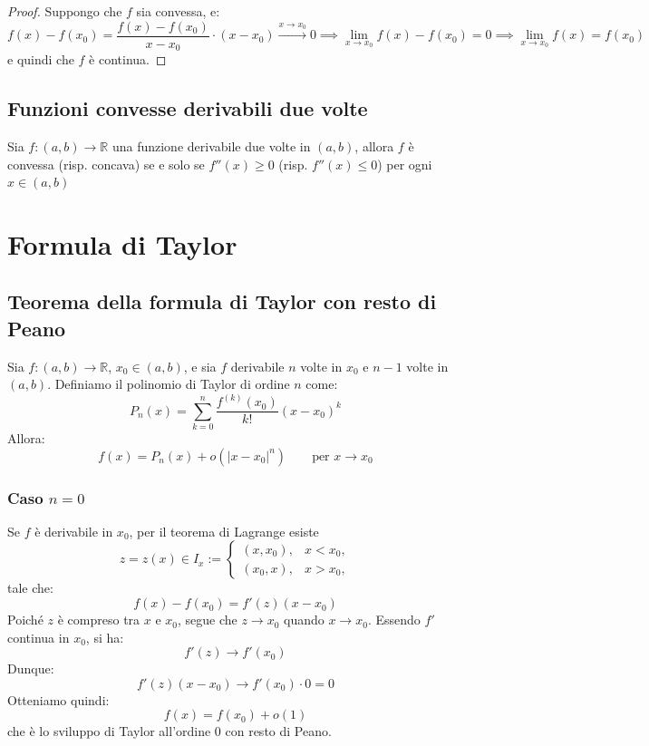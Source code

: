 \documentclass[a4paper,12pt,openright]{book}
\begin{document}
	\begin{proof}
		Suppongo che $f$ sia convessa, e:
		\[f(x) - f(x_0) = \frac{f(x) - f(x_0)}{x - x_0} \cdot (x - x_0) \overset{x \rightarrow x_0}{\longrightarrow} 0 \implies \lim_{x \rightarrow x_0} f(x) - f(x_0) = 0 \implies \lim_{x \rightarrow x_0} f(x) = f(x_0)\]
		e quindi che $f$ è continua.
	\end{proof}  
	
	\section{Funzioni convesse derivabili due volte}
	Sia $f: (a, b) \rightarrow \mathbb{R}$ una funzione derivabile due volte in $(a, b)$, allora $f$ è convessa (risp. concava) se e solo se $f''(x) \geq 0$ (risp. $f''(x) \leq 0$) per ogni $x \in (a, b)$ 
	
	
	\chapter{Formula di Taylor}
	\section{Teorema della formula di Taylor con resto di Peano}
	Sia $f : (a,b) \to \mathbb{R}$, $x_0 \in (a,b)$, e sia $f$ derivabile $n$ volte in $x_0$ e $n-1$ volte in $(a,b)$. Definiamo il polinomio di Taylor di ordine $n$ come:
	\[P_n(x) = \sum_{k=0}^{n} \frac{f^{(k)}(x_0)}{k!}(x - x_0)^k\]
	Allora:
	\[f(x) = P_n(x) + o(|x - x_0|^n) \qquad \text{per } x \to x_0\]
	\subsection*{Caso $n=0$}
	Se $f$ è derivabile in $x_0$, per il teorema di Lagrange esiste
	\[z = z(x) \in I_x := 
	\begin{cases}
		(x, x_0), & x < x_0,\\
		(x_0, x), & x > x_0,
	\end{cases}\]
	tale che:	
	\[f(x) - f(x_0) = f'(z)(x - x_0)\]
	Poiché $z$ è compreso tra $x$ e $x_0$, segue che $z \to x_0$ quando $x \to x_0$.  
	Essendo $f'$ continua in $x_0$, si ha:	
	\[f'(z) \longrightarrow f'(x_0)\]
	Dunque:	
	\[f'(z)(x - x_0) \longrightarrow f'(x_0)\cdot 0 = 0\]
	Otteniamo quindi:	
	\[f(x) = f(x_0) + o(1)\]
	che è lo sviluppo di Taylor all'ordine $0$ con resto di Peano.
	
	
\end{document}
